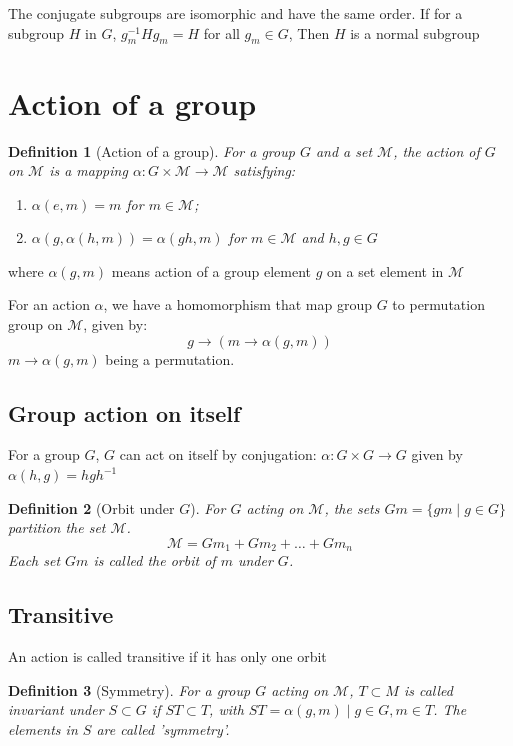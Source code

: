 \documentclass{amsart}
\newcommand{\setM}{\mathcal{M}}
\newtheorem{definition}{Definition}
\begin{document}
The conjugate subgroups are isomorphic and have the same order. If for a subgroup $H$ in $G$, $g_m^{-1}Hg_m = H$
for all $g_m \in G$, Then $H$ is a normal subgroup


\section*{Action of a group}

\begin{definition}
    [Action of a group]
    For a group $G$ and a set $\setM$, the action of $G$ on $\setM$ is a mapping 
    $\alpha\colon G\times \setM \to \setM$ satisfying:
    \begin{enumerate}
        \item $\alpha(e,m) = m$ for $m \in \setM$;
        \item $\alpha(g, \alpha(h,m)) = \alpha(gh, m)$ for $m\in \setM$ and $h,g\in G$
    \end{enumerate}
\end{definition}
where $\alpha(g,m)$ means action of a group element $g$ on a set element in $\setM$

For an action $\alpha$, we have a homomorphism that map group $G$ to permutation group on $\setM$, 
given by:
\[g\to (m\to \alpha(g,m))\]
$m\to \alpha(g,m)$ being a permutation. 

\subsection*{Group action on itself}
For a group $G$, $G$ can act on itself by conjugation: $\alpha\colon G\times G \to G$ given by
$\alpha(h,g) = hgh^{-1}$

\vspace{10pt}

\begin{definition}
    [Orbit under $G$]
    For $G$ acting on $\setM$, the sets $Gm = \{gm\mid g\in G\}$ partition the set $\setM$. 
    \[\setM = Gm_1 + Gm_2 + \dots + Gm_n\]
    Each set $Gm$ is called the orbit of $m$ under $G$.
\end{definition}

\subsection*{Transitive}
An action is called transitive if it has only one orbit

\begin{definition}
    [Symmetry]
    For a group $G$ acting on $\setM$, $T\subset M$ is called invariant under $S \subset G$ if $ST\subset T$, 
    with $ST = {\alpha(g,m)\mid g \in G, m\in T}$. 
    The elements in $S$ are called 'symmetry'.
\end{definition}
\end{document}
